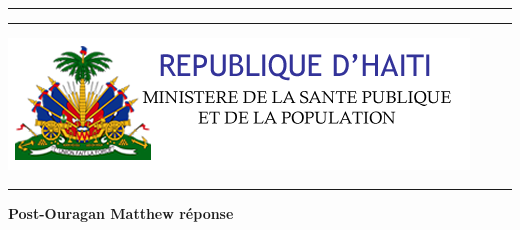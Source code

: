 \begin{titlepage}

\hspace*{-1cm}\begin{minipage}[t][0.1\textheight]{5cm}
\textcolor{whoblue!15}{\rule{5cm}{0.1\textheight}}
\end{minipage}
\hspace*{1cm}\begin{minipage}[t]{11.3cm}
\textcolor{whoblue}{\rule{11.3cm}{0.5mm}}
\end{minipage}

\hspace*{-1cm}\begin{minipage}[t][0.1\textheight]{5cm}
\vspace{0pt}
\includegraphics[height=0.1\textheight]{./figure/logo_mspp.png}\\[0.55cm]
\textcolor{whoblue!15}{\rule{5cm}{0.1\textheight}}
\end{minipage}
\hspace*{1cm}\begin{minipage}[t][0.2\textheight]{11.3cm}{}
\vspace{0pt}
\begin{flushright}
\begin{spacing}{2.0}
{\huge \textbf{Post-Ouragan Matthew réponse}}
\end{spacing}
\end{flushright}
\end{minipage}


\end{titlepage}
